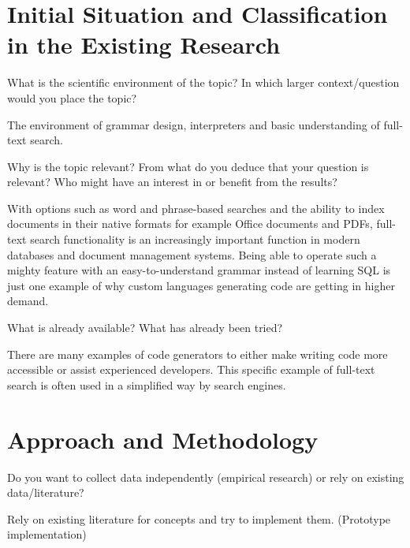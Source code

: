 \section{Initial Situation and Classification in the Existing Research}
What is the scientific environment of the topic? In which larger context/question would you place the topic?

The environment of grammar design, interpreters and basic understanding of full-text search.

Why is the topic relevant? From what do you deduce that your question is relevant? Who might have an interest in or benefit from the results?

With options such as word and phrase-based searches and the ability to index documents in their native formats for example Office documents and PDFs, full-text search functionality is an increasingly important function in modern databases and document management systems. Being able to operate such a mighty feature with an easy-to-understand grammar instead of learning SQL is just one example of why custom languages generating code are getting in higher demand.

What is already available? What has already been tried?

There are many examples of code generators to either make writing code more accessible or assist experienced developers. This specific example of full-text search is often used in a simplified way by search engines.
\section{Approach and Methodology}
Do you want to collect data independently (empirical research) or rely on existing data/literature?

Rely on existing literature for concepts and try to implement them. (Prototype implementation)
